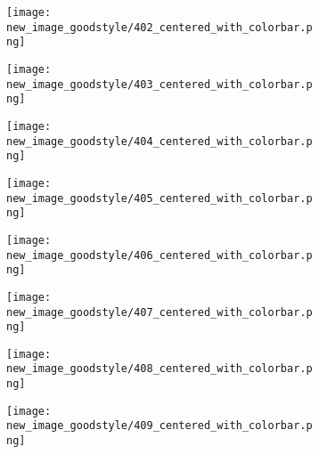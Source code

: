 \documentclass[a4paper,12pt]{article}
\begin{document}
\begin{figure}[H]
  \begin{subfigure}{0.11\textwidth}
    \texttt{[image: new\_image\_goodstyle/402\_centered\_with\_colorbar.png]}
  \end{subfigure}
  \hfill
  \begin{subfigure}{0.11\textwidth}
    \texttt{[image: new\_image\_goodstyle/403\_centered\_with\_colorbar.png]}
  \end{subfigure}
  \hfill
  \begin{subfigure}{0.11\textwidth}
    \texttt{[image: new\_image\_goodstyle/404\_centered\_with\_colorbar.png]}
  \end{subfigure}
  \hfill
  \begin{subfigure}{0.11\textwidth}
    \texttt{[image: new\_image\_goodstyle/405\_centered\_with\_colorbar.png]}
  \end{subfigure}
  \hfill
  \begin{subfigure}{0.11\textwidth}
    \texttt{[image: new\_image\_goodstyle/406\_centered\_with\_colorbar.png]}
  \end{subfigure}
  \hfill
  \begin{subfigure}{0.11\textwidth}
    \texttt{[image: new\_image\_goodstyle/407\_centered\_with\_colorbar.png]}
  \end{subfigure}
  \hfill
  \begin{subfigure}{0.11\textwidth}
    \texttt{[image: new\_image\_goodstyle/408\_centered\_with\_colorbar.png]}
  \end{subfigure}
  \hfill
  \begin{subfigure}{0.11\textwidth}
    \texttt{[image: new\_image\_goodstyle/409\_centered\_with\_colorbar.png]}
  \end{subfigure}
  \hfill
\end{figure}
\end{document}
